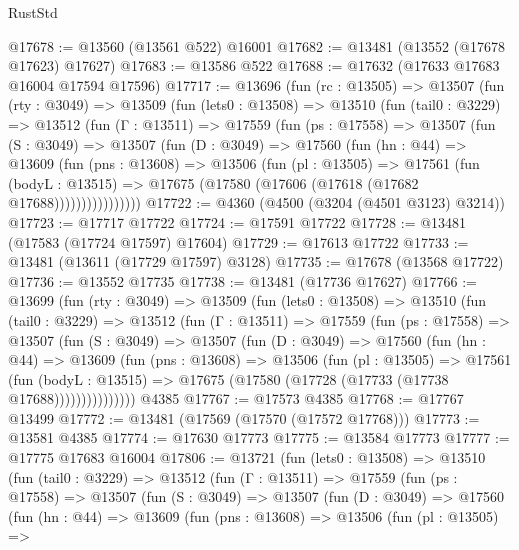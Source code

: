 \begin{lexlean}{RustStd}
\begin{coremodule}
@17678 := @13560 (@13561 @522) @16001
@17682 := @13481 (@13552 (@17678 @17623) @17627)
@17683 := @13586 @522
@17688 := @17632 (@17633 @17683 @16004 @17594 @17596)
@17717 := @13696
    (fun (rc : @13505) =>
    @13507
      (fun (rty : @3049) =>
      @13509
        (fun (lets0 : @13508) =>
        @13510
          (fun (tail0 : @3229) =>
          @13512
            (fun (Γ : @13511) =>
            @17559
              (fun (ps : @17558) =>
              @13507
                (fun (S : @3049) =>
                @13507
                  (fun (D : @3049) =>
                  @17560
                    (fun (hn : @44) =>
                    @13609
                      (fun (pns : @13608) =>
                      @13506
                        (fun (pl : @13505) =>
                        @17561
                          (fun (bodyL : @13515) =>
                          @17675 (@17580 (@17606 (@17618 (@17682 @17688))))))))))))))))
@17722 := @4360 (@4500 (@3204 (@4501 @3123) @3214))
@17723 := @17717 @17722
@17724 := @17591 @17722
@17728 := @13481 (@17583 (@17724 @17597) @17604)
@17729 := @17613 @17722
@17733 := @13481 (@13611 (@17729 @17597) @3128)
@17735 := @17678 (@13568 @17722)
@17736 := @13552 @17735
@17738 := @13481 (@17736 @17627)
@17766 := @13699
    (fun (rty : @3049) =>
    @13509
      (fun (lets0 : @13508) =>
      @13510
        (fun (tail0 : @3229) =>
        @13512
          (fun (Γ : @13511) =>
          @17559
            (fun (ps : @17558) =>
            @13507
              (fun (S : @3049) =>
              @13507
                (fun (D : @3049) =>
                @17560
                  (fun (hn : @44) =>
                  @13609
                    (fun (pns : @13608) =>
                    @13506
                      (fun (pl : @13505) =>
                      @17561
                        (fun (bodyL : @13515) =>
                        @17675 (@17580 (@17728 (@17733 (@17738 @17688)))))))))))))))
    @4385
@17767 := @17573 @4385
@17768 := @17767 @13499
@17772 := @13481 (@17569 (@17570 (@17572 @17768)))
@17773 := @13581 @4385
@17774 := @17630 @17773
@17775 := @13584 @17773
@17777 := @17775 @17683 @16004
@17806 := @13721
    (fun (lets0 : @13508) =>
    @13510
      (fun (tail0 : @3229) =>
      @13512
        (fun (Γ : @13511) =>
        @17559
          (fun (ps : @17558) =>
          @13507
            (fun (S : @3049) =>
            @13507
              (fun (D : @3049) =>
              @17560
                (fun (hn : @44) =>
                @13609
                  (fun (pns : @13608) =>
                  @13506
                    (fun (pl : @13505) =>

\end{coremodule}
\end{lexlean}
